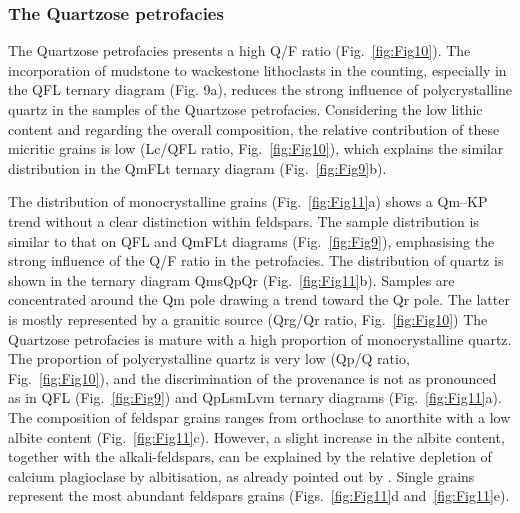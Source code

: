 \documentclass[twoside]{article}
\begin{document}

\subsubsection{The Quartzose petrofacies}

The Quartzose petrofacies presents a high Q/F ratio (Fig.~\ref{fig:Fig10}). The incorporation of mudstone to wackestone lithoclasts in the counting, especially in the QFL ternary diagram (Fig. 9a), reduces the strong influence of polycrystalline quartz in the samples of the Quartzose petrofacies. Considering the low lithic content and regarding the overall composition, the relative contribution of these micritic grains is low (Lc/QFL ratio, Fig.~\ref{fig:Fig10}), which explains the similar distribution in the QmFLt ternary diagram (Fig.~\ref{fig:Fig9}b).\par
\medskip
The distribution of monocrystalline grains (Fig.~\ref{fig:Fig11}a) shows a Qm–KP trend without a clear distinction within feldspars. The sample distribution is similar to that on QFL and QmFLt diagrams (Fig.~\ref{fig:Fig9}), emphasising the strong influence of the Q/F ratio in the petrofacies. The distribution of quartz is shown in the ternary diagram QmsQpQr (Fig.~\ref{fig:Fig11}b). Samples are concentrated around the Qm pole drawing a trend toward the Qr pole. The latter is mostly represented by a granitic source (Qrg/Qr ratio, Fig.~\ref{fig:Fig10}) The Quartzose petrofacies is mature with a high proportion of monocrystalline quartz. The proportion of polycrystalline quartz is very low (Qp/Q ratio, Fig.~\ref{fig:Fig10}), and the discrimination of the provenance is not as pronounced as in QFL (Fig.~\ref{fig:Fig9}) and QpLsmLvm ternary diagrams (Fig.~\ref{fig:Fig11}a). The composition of feldspar grains ranges from orthoclase to anorthite with a low albite content (Fig.~\ref{fig:Fig11}c). However, a slight increase in the albite content, together with the alkali-feldspars, can be explained by the relative depletion of calcium plagioclase by albitisation, as already pointed out by \cite{Morad1990}. Single grains represent the most abundant feldspars grains (Figs.~\ref{fig:Fig11}d and~\ref{fig:Fig11}e).\par
\medskip
\end{document}
